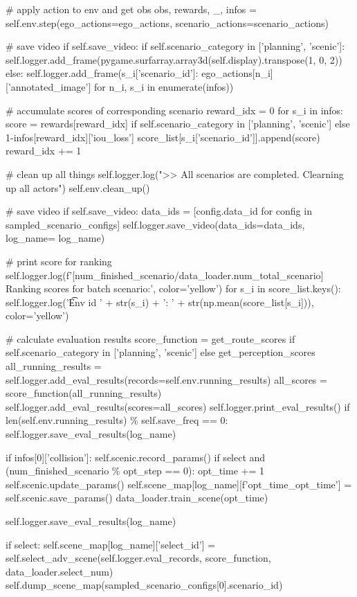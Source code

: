 \begin{appendix}
\# apply action to env and get obs
obs, rewards, \_, infos = self.env.step(ego\_actions=ego\_actions, scenario\_actions=scenario\_actions)

\# save video
if self.save\_video:
if self.scenario\_category in ['planning', 'scenic']:
self.logger.add\_frame(pygame.surfarray.array3d(self.display).transpose(1, 0, 2))
else:
self.logger.add\_frame({s\_i['scenario\_id']: ego\_actions[n\_i]['annotated\_image'] for n\_i, s\_i in enumerate(infos)})

\# accumulate scores of corresponding scenario
reward\_idx = 0
for s\_i in infos:
score = rewards[reward\_idx] if self.scenario\_category in ['planning', 'scenic'] else 1-infos[reward\_idx]['iou\_loss']
score\_list[s\_i['scenario\_id']].append(score)
reward\_idx += 1

\# clean up all things
self.logger.log(">> All scenarios are completed. Clearning up all actors")
self.env.clean\_up()

\# save video
if self.save\_video:
data\_ids = [config.data\_id for config in sampled\_scenario\_configs]
self.logger.save\_video(data\_ids=data\_ids, log\_name= log\_name)

\# print score for ranking
self.logger.log(f'[{num\_finished\_scenario}/{data\_loader.num\_total\_scenario}] Ranking scores for batch scenario:', color='yellow')
for s\_i in score\_list.keys():
self.logger.log('\t Env id ' + str(s\_i) + ': ' + str(np.mean(score\_list[s\_i])), color='yellow')

\# calculate evaluation results
score\_function = get\_route\_scores if self.scenario\_category in ['planning', 'scenic'] else get\_perception\_scores
all\_running\_results = self.logger.add\_eval\_results(records=self.env.running\_results)
all\_scores = score\_function(all\_running\_results)
self.logger.add\_eval\_results(scores=all\_scores)
self.logger.print\_eval\_results()
if len(self.env.running\_results) \% self.save\_freq == 0:
self.logger.save\_eval\_results(log\_name)

if infos[0]['collision']:
self.scenic.record\_params()
if select and (num\_finished\_scenario \% opt\_step == 0):
opt\_time += 1
self.scenic.update\_params()
self.scene\_map[log\_name][f'opt\_time\_{opt\_time}'] = self.scenic.save\_params()
data\_loader.train\_scene(opt\_time)

self.logger.save\_eval\_results(log\_name)

if select:
self.scene\_map[log\_name]['select\_id'] = self.select\_adv\_scene(self.logger.eval\_records, score\_function, data\_loader.select\_num)
self.dump\_scene\_map(sampled\_scenario\_configs[0].scenario\_id)


\end{appendix}
